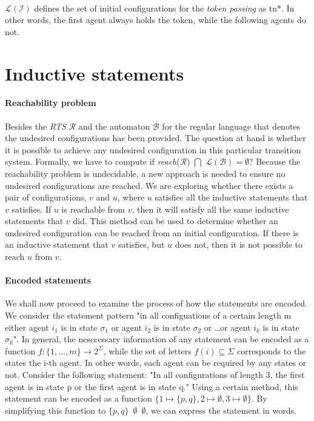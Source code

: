 \paragraph*{}
$\mathcal{L}(\mathcal{I})$ defines the set of initial configurations for the \textit{token passing} 
as tn*.
In other words, the first agent always holds the token, while the following agents do not.

\section{Inductive statements}\label{section:inductive_statements}
\paragraph*{Reachability problem}
Besides the \textit{RTS} $\mathcal{R}$ and the automaton $\mathcal{B}$ for the regular language that denotes the undesired configurations has been provided.
The question at hand is whether it is possible to achieve any undesired configuration in this particular transition system.
Formally, we have to compute
if \textit{reach}($\mathcal{R}$)
$\bigcap$ $\mathcal{L}(\mathcal{B}) = \emptyset?$
Because the reachability problem is undecidable, a new approach is needed to 
ensure no undesired configurations are reached.
We are exploring whether there exists a pair of configurations, $v$ and $u$, 
where $u$ satisfies all the inductive statements that $v$ satisfies. If $u$ is 
reachable from $v$, then it will satisfy all the same inductive statements that $v$ did. 
This method can be used to determine whether an undesired configuration can be reached 
from an initial configuration. 
If there is an inductive statement that $v$ satisfies, but $u$ does not, then it is not possible to reach $u$ from $v$.

\paragraph*{Encoded statements}
We shall now proceed to examine the process of how the statements are encoded.
We consider the statement pattern "in all configuations of a certain length
m either agent $i_1$ is in state $\sigma_1$ or agent $i_2$ is in state
$\sigma_2$ or \dots or agent $i_k$ is in state $\sigma_k$".
In general, the nesccessary information of any statement can be encoded
as a function $f: \lbrace 1, \dots, m\rbrace \rightarrow 2^{\Sigma}$, 
while the set of letters $f(i) \subseteq \Sigma$ corresponds to the states the i-th 
agent. In other words, each agent can be  required by any states or not.
Consider the following statement: "In all configurations of length 3, 
the first agent is in state p or the first agent is in state q." 
Using a certain method, this statement can be encoded as a function 
$\lbrace 1 \mapsto \lbrace p,q \rbrace, 2 \mapsto \emptyset, 3 \mapsto \emptyset \rbrace$.
By simplifying this function to $\lbrace p,q \rbrace$  $\,\emptyset$ $\,\emptyset$, we can express the statement in words.

